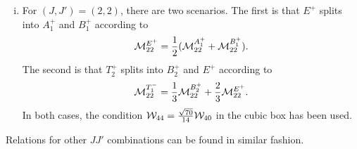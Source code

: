 \documentclass[aps,prd,reprint,showpacs,floatfix,longbibliography,,superscriptaddress]{revtex4-1}
\def\mw{\mathcal{W}}
\def\mm{\mathcal{M}}
\def\beq{\begin{equation}}
\def\eeq{\end{equation}}
\begin{document}
\begin{widetext}
\begin{enumerate}[(i)]
\item
For $(J,J')=(2,2)$, there are two scenarios.  
The first is that $E^+$ splits into $A^+_1$ and  $B^+_1$ according to 
\beq  \mm^{E^+}_{22} = {1\over 2}(\mm^{A^+_1}_{22} + \mm^{B^+_1}_{22}). \eeq
The second is that $T^+_2$ splits into $B^+_2$ and $E^+$ according to 
\beq \mm^{T^-_1}_{22} =  {1\over 3}  \mm^{B^+_2}_{22}  +  {2\over 3} \mm^{E^+}_{22}. \eeq
In both cases, the condition $\mw_{44} = {\sqrt{70}\over 14}  \mw_{40}$ in the cubic box has been used. %
\end{enumerate}
Relations for other $JJ'$ combinations can be found in similar fashion.


\end{widetext}
\end{document}
